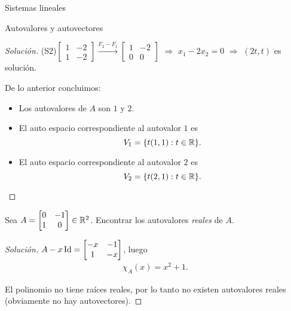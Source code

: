 \begin{chapter}{Sistemas lineales}
\begin{section}{Autovalores y autovectores}
\begin{proof}[Solución]
        (S2)\quad  $\begin{bmatrix}1&-2 \\ 1&-2\end{bmatrix} \stackrel{F_2 -F_1}{\longrightarrow} \begin{bmatrix}1&-2 \\ 0&0\end{bmatrix}$  $\Rightarrow$ $x_1-2x_2=0$ $\Rightarrow$ $(2t,t)$ es solución. 
    
     
    
    
     De lo anterior concluimos:
        
            \begin{itemize}
                \item Los autovalores de $A$ son $1$ y $2$.
                \item El auto espacio correspondiente al  autovalor $1$ es
            \begin{equation*}
                V_1 = \{t(1,1): t \in \mathbb R\}.
            \end{equation*}
            \item El auto espacio correspondiente al  autovalor $2$ es
            \begin{equation*}
                V_2 = \{t(2,1): t \in \mathbb R\}.
            \end{equation*}
            \end{itemize}
    
            
        \end{proof}
    

    
        \begin{ejemplo*}
         Sea $A= \begin{bmatrix}0&-1\\1&0\end{bmatrix} \in \mathbb R^2$. Encontrar los autovalores \textit{reales} de $A$.    
        \end{ejemplo*}
        \begin{proof}[Solución]
            $A-x \operatorname{Id}= \begin{bmatrix}-x&-1\\1&-x\end{bmatrix}$, luego
            \begin{align*}
                \chi_A(x)=x^2+1.
                \end{align*}
 
                
            El polinomio no tiene raíces reales, por lo tanto no existen autovalores reales (obviamente no hay autovectores).
        \end{proof}


\end{section}
\end{chapter}
